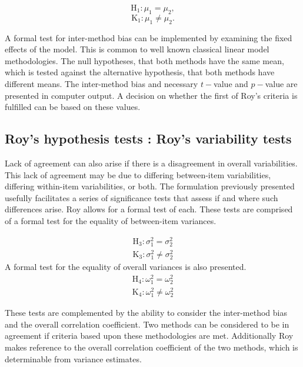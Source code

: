 \documentclass[12pt, a4paper]{report}
\theoremstyle{plain}
\theoremstyle{definition}
\theoremstyle{remark}
\begin{document}
	\[	\operatorname{H_1} : \mu_1 = \mu_2 ,\]
	\[	\operatorname{K_1} : \mu_1 \neq \mu_2.\]
	
	
	
	
	A formal test for inter-method bias can be implemented by examining the fixed effects of the model. This is common to well known classical linear model methodologies. The null hypotheses, that both methods have the same mean, which is tested against the alternative hypothesis, that both methods have different means.
	The inter-method bias and necessary $t-$value and $p-$value are presented in computer output. A decision on whether the first of Roy's criteria is fulfilled can be based on these values.
	
	

	\subsection{Roy's hypothesis tests : Roy's variability tests}
	
	Lack of agreement can also arise if there is a disagreement in overall variabilities. This lack of agreement may be due to differing between-item variabilities, differing within-item variabilities, or both. The formulation previously presented usefully facilitates a series of significance tests that assess if and where such differences arise. Roy allows for a formal test of each. These tests are comprised of a formal test for the equality of between-item variances.
	

	
	\begin{eqnarray*}
		\operatorname{H_3} : \sigma^2_1 = \sigma^2_2 \\
		\operatorname{K_3} : \sigma^2_1 \neq \sigma^2_2
	\end{eqnarray*}
	A formal test for the equality of overall variances is also presented.
	\begin{eqnarray*}
		\operatorname{H_4} : \omega^2_1 = \omega^2_2 \\
		\operatorname{K_4} : \omega^2_1 \neq \omega^2_2
	\end{eqnarray*}
	
	
	These tests are complemented by the ability to consider the inter-method bias and the overall correlation coefficient.
	Two methods can be considered to be in agreement if criteria based upon these methodologies are met. Additionally Roy makes reference to the overall correlation coefficient of the two methods, which is determinable from variance estimates.
	
\end{document}
